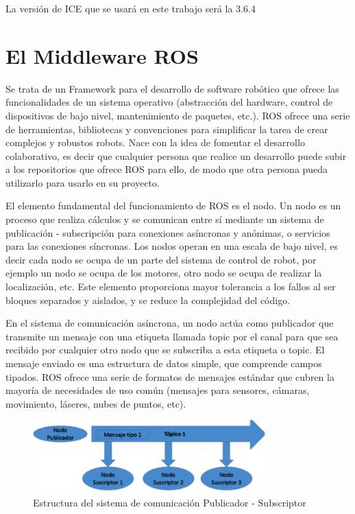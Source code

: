 La versión de ICE que se usará en este trabajo será la 3.6.4

\section{El Middleware ROS}
Se trata de un Framework para el desarrollo de software robótico que ofrece las funcionalidades de un sistema operativo (abstracción del hardware, control de dispositivos de bajo nivel, mantenimiento de paquetes, etc.). ROS ofrece una serie de herramientas, bibliotecas y convenciones para simplificar la tarea de crear complejos y robustos robots. Nace con la idea de fomentar el desarrollo colaborativo, es decir que cualquier persona que realice un desarrollo puede subir a los repositorios que ofrece ROS para ello, de modo que otra persona pueda utilizarlo para usarlo en su proyecto.

El elemento fundamental del funcionamiento de ROS es el nodo. Un nodo es un proceso que realiza cálculos y se comunican entre sí mediante un sistema de publicación - subscripción para conexiones asíncronas y anónimas, o servicios para las conexiones síncronas. Los nodos operan en una escala de bajo nivel, es decir cada nodo se ocupa de un parte del sistema de control de robot, por ejemplo un nodo se ocupa de los motores, otro nodo se ocupa de realizar la localización, etc. Este elemento proporciona mayor tolerancia a los fallos al ser bloques separados y aislados, y se reduce la complejidad del código.

En el sistema de comunicación asíncrona, un nodo actúa como publicador que transmite un mensaje con una etiqueta llamada topic por el canal para que sea recibido por cualquier otro nodo que se subscriba a esta etiqueta o topic. El mensaje enviado es una estructura de datos simple, que comprende campos tipados. ROS ofrece una serie de formatos de mensajes estándar que cubren la mayoría de necesidades de uso común (mensajes para sensores, cámaras, movimiento, láseres, nubes de puntos, etc).

\begin{figure}[H]
  \begin{center}
    \includegraphics[width=0.8\textwidth]{figures/publicadorsubscriptor.png}
		\caption{Estructura del sistema de comunicación Publicador - Subscriptor}
		\label{fig.publicadorsubscriptor}
		\end{center}
\end{figure}

